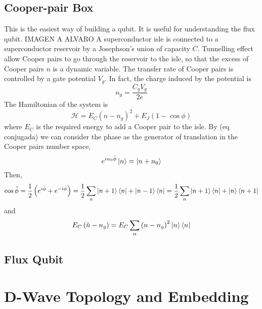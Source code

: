 \subsection{Cooper-pair Box}
This is the easiest way of building a qubit. It is useful for understanding the flux qubit.
IMAGEN A ALVARO
A superconductor isle is connected to a superconductor reservoir by a Josephson's union of capacity $C$.
Tunnelling effect allow Cooper pairs to go through the reservoir to the isle, so that the excess of Cooper pairs $n$ is a dynamic variable. The transfer rate of Cooper pairs is controlled by a gate potential $V_{g}$. In fact, the charge induced by the potential is
\begin{equation}
n_{g} =\frac{C_{g}V_{g}}{2e}
\end{equation}
The Hamiltonian of the system is
\begin{equation}
\mathcal{H} = E_{C}\left(n - n_{g}\right)^{2} + E_{J}\left(1 - \cos{\phi}\right)
\end{equation}
where $E_{C}$ is the required energy to add a Cooper pair to the isle.
By (eq conjugada) we can consider the phase as the generator of translation in the Cooper pairs number space, 
\begin{equation}
e^{in_{0}\hat{\phi}}\ket{n} = \ket{n + n_{0}}
\end{equation}
Then,
\begin{equation}
\cos{\hat{\phi}} = \frac{1}{2}\left(e^{i\hat{\phi}} + e^{-i\hat{\phi}} \right) = \frac{1}{2}\sum_{n}\ket{n+1}\bra{n} + \ket{n-1}\bra{n} = \frac{1}{2}\sum_{n}\ket{n+1}\bra{n} + \ket{n}\bra{n+1}
\end{equation}
and
\begin{equation}
E_{C}\left(\hat{n} - n_{g}\right) = E_{C}\sum_{n}\left(n -n_{g}\right)^{2}\ket{n}\bra{n}
\end{equation}
\subsection{Flux Qubit}
\section{D-Wave Topology and Embedding}